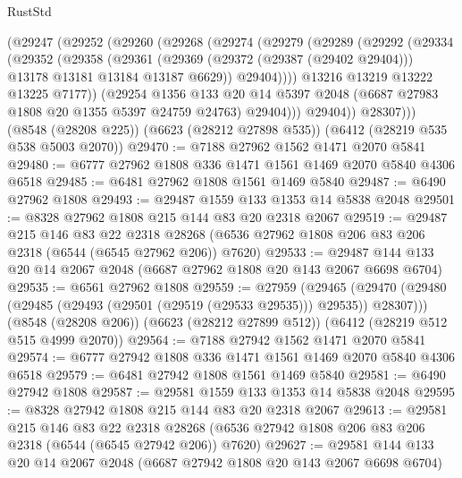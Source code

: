 \begin{lexlean}{RustStd}
\begin{coremodule}
        (@29247
          (@29252
            (@29260
              (@29268
                (@29274
                  (@29279
                    (@29289
                      (@29292
                        (@29334
                          (@29352
                            (@29358
                              (@29361
                                (@29369
                                  (@29372 (@29387 (@29402 @29404)))
                                  @13178
                                  @13181
                                  @13184
                                  @13187
                                  @6629))
                              @29404))))
                      @13216
                      @13219
                      @13222
                      @13225
                      @7177))
                  (@29254
                    @1356
                    @133
                    @20
                    @14
                    @5397
                    @2048
                    (@6687 @27983 @1808 @20 @1355 @5397 @24759 @24763)
                    @29404)))
              @29404))
          @28307)))
    (@8548 (@28208 @225))
    (@6623 (@28212 @27898 @535))
    (@6412 (@28219 @535 @538 @5003 @2070))
@29470 := @7188 @27962 @1562 @1471 @2070 @5841
@29480 := @6777 @27962 @1808 @336 @1471 @1561 @1469 @2070 @5840 @4306 @6518
@29485 := @6481 @27962 @1808 @1561 @1469 @5840
@29487 := @6490 @27962 @1808
@29493 := @29487 @1559 @133 @1353 @14 @5838 @2048
@29501 := @8328 @27962 @1808 @215 @144 @83 @20 @2318 @2067
@29519 := @29487
    @215
    @146
    @83
    @22
    @2318
    @28268
    (@6536 @27962 @1808 @206 @83 @206 @2318 (@6544 (@6545 @27962 @206)) @7620)
@29533 := @29487 @144 @133 @20 @14 @2067 @2048 (@6687 @27962 @1808 @20 @143 @2067 @6698 @6704)
@29535 := @6561 @27962 @1808
@29559 := @27959
    (@29465 (@29470 (@29480 (@29485 (@29493 (@29501 (@29519 (@29533 @29535))) @29535)) @28307)))
    (@8548 (@28208 @206))
    (@6623 (@28212 @27899 @512))
    (@6412 (@28219 @512 @515 @4999 @2070))
@29564 := @7188 @27942 @1562 @1471 @2070 @5841
@29574 := @6777 @27942 @1808 @336 @1471 @1561 @1469 @2070 @5840 @4306 @6518
@29579 := @6481 @27942 @1808 @1561 @1469 @5840
@29581 := @6490 @27942 @1808
@29587 := @29581 @1559 @133 @1353 @14 @5838 @2048
@29595 := @8328 @27942 @1808 @215 @144 @83 @20 @2318 @2067
@29613 := @29581
    @215
    @146
    @83
    @22
    @2318
    @28268
    (@6536 @27942 @1808 @206 @83 @206 @2318 (@6544 (@6545 @27942 @206)) @7620)
@29627 := @29581 @144 @133 @20 @14 @2067 @2048 (@6687 @27942 @1808 @20 @143 @2067 @6698 @6704)

\end{coremodule}
\end{lexlean}
